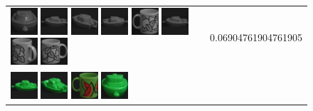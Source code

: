 \begin{figure}[tbp]
\begin{center}
\begin{tabular}{m{11cm} | m{3cm} |}
\includegraphics[width=1cm]{coil/beeld-28.eps}
\includegraphics[width=1cm]{coil/beeld-24.eps}
\includegraphics[width=1cm]{coil/beeld-25.eps}
\includegraphics[width=1cm]{coil/beeld-27.eps}
\includegraphics[width=1cm]{coil/beeld-51.eps}
\includegraphics[width=1cm]{coil/beeld-24.eps}
\includegraphics[width=1cm]{coil/beeld-49.eps}
\includegraphics[width=1cm]{coil/beeld-48.eps}
& {\scriptsize 0.06904761904761905}
\\
\includegraphics[width=1cm]{coil/beeld-54.eps}
\includegraphics[width=1cm]{coil/beeld-58.eps}
\includegraphics[width=1cm]{coil/beeld-31.eps}
\includegraphics[width=1cm]{coil/beeld-56.eps}

\end{tabular}
\end{center}
\end{figure}

